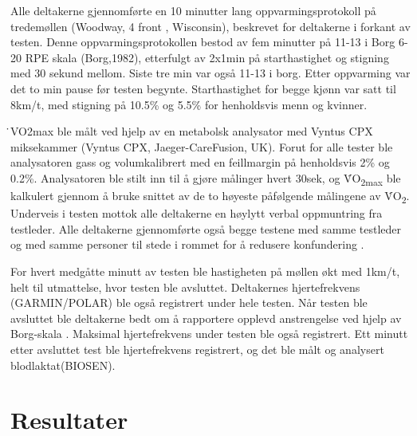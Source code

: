 \documentclass[
]{book}
\begin{document}
Alle deltakerne gjennomførte en 10 minutter lang oppvarmingsprotokoll på
tredemøllen (Woodway, 4 front , Wisconsin), beskrevet for deltakerne i
forkant av testen. Denne oppvarmingsprotokollen bestod av fem minutter
på 11-13 i Borg 6-20 RPE skala (Borg,1982),
etterfulgt av 2x1min på starthastighet og stigning med 30 sekund
mellom.
Siste tre min var også 11-13 i
borg. Etter oppvarming
var det to min pause før testen begynte. Starthastighet for begge
kjønn var satt til
8km/t, med stigning på 10.5\% og 5.5\% for henholdsvis menn og kvinner.

̇VO2max ble målt ved hjelp av en metabolsk analysator med
Vyntus CPX miksekammer (Vyntus CPX, Jaeger-CareFusion, UK). Forut for
alle tester ble analysatoren gass og volumkalibrert med en feillmargin
på henholdsvis 2\% og 0.2\%. Analysatoren ble
stilt inn til å gjøre målinger hvert 30sek, og V̇O\textsubscript{2max} ble kalkulert
gjennom å bruke snittet av de to høyeste påfølgende målingene av V̇O\textsubscript{2}.
Underveis i testen mottok alle deltakerne en høylytt verbal oppmuntring
fra testleder. Alle deltakerne
gjennomførte også begge testene med samme testleder og med samme
personer til stede i rommet for å redusere konfundering \citep{halperin}.

For hvert medgåtte minutt av testen ble hastigheten på møllen økt med
1km/t, helt til utmattelse, hvor testen ble avsluttet. Deltakernes
hjertefrekvens (GARMIN/POLAR) ble også registrert under hele testen. Når
testen ble avsluttet ble deltakerne bedt om å rapportere opplevd
anstrengelse ved hjelp av Borg-skala \citep{borg1982}. Maksimal
hjertefrekvens under testen ble også registrert. Ett minutt etter
avsluttet test ble hjertefrekvens registrert, og det ble målt og
analysert blodlaktat(BIOSEN).

\hypertarget{resultater}{%
\section{Resultater}\label{resultater}}

\providecommand{\docline}[3]{\noalign{\global\setlength{\arrayrulewidth}{#1}}\arrayrulecolor[HTML]{#2}\cline{#3}}

\setlength{\tabcolsep}{2pt}

\renewcommand*{\arraystretch}{1.5}
\end{document}
